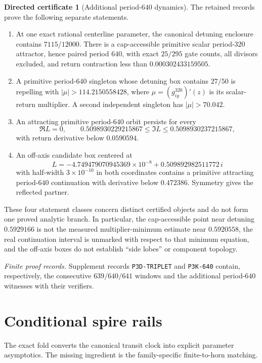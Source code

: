 \documentclass[11pt]{article}
\theoremstyle{definition}
\newtheorem{certificate}[theorem]{Directed certificate}
\theoremstyle{remark}
\begin{document}
\begin{certificate}[Additional period-$640$ dynamics]\label{cert:finite-secondary}
The retained records prove the following separate statements.
\begin{enumerate}[leftmargin=2em]
  \item At one exact rational centerline parameter, the canonical detuning enclosure contains $7115/12000$.  There is a cap-accessible primitive scalar period-$320$ attractor, hence paired period $640$, with exact $25/295$ gate counts, all divisors excluded, and return contraction less than $0.000302433159505$.
  \item A primitive period-$640$ singleton whose detuning box contains $27/50$ is repelling with $|\mu|>114.2150558428$, where $\mu=(g_{iy}^{320})'(z)$ is its scalar-return multiplier.  A second independent singleton has $|\mu|>70.042$.
  \item An attracting primitive period-$640$ orbit persists for every
  \[
    \Re L=0,
    \qquad
    0.5098930229215867\le\Im L\le0.5098930237215867,
  \]
  with return derivative below $0.0590594$.
  \item An off-axis candidate box centered at
  \[
    L=-4.749479070945369\times10^{-8}
      +0.509892982511772\,i
  \]
  with half-width $3\times10^{-10}$ in both coordinates contains a primitive attracting period-$640$ continuation with derivative below $0.472386$.  Symmetry gives the reflected partner.
\end{enumerate}
\end{certificate}

These four statement classes concern distinct certified objects and do not form one proved analytic branch.  In particular, the cap-accessible point near detuning $0.5929166$ is not the measured multiplier-minimum estimate near $0.5920558$, the real continuation interval is unmarked with respect to that minimum equation, and the off-axis boxes do not establish ``side lobes'' or component topology.

\noindent\emph{Finite proof records.}  Supplement records \texttt{P3D-TRIPLET} and \texttt{P3K-640} contain, respectively, the consecutive $639/640/641$ windows and the additional period-$640$ witnesses with their verifiers.

\section{Conditional spire rails}

The exact fold converts the canonical transit clock into explicit parameter asymptotics.  The missing ingredient is the family-specific finite-to-horn matching.
\end{document}
